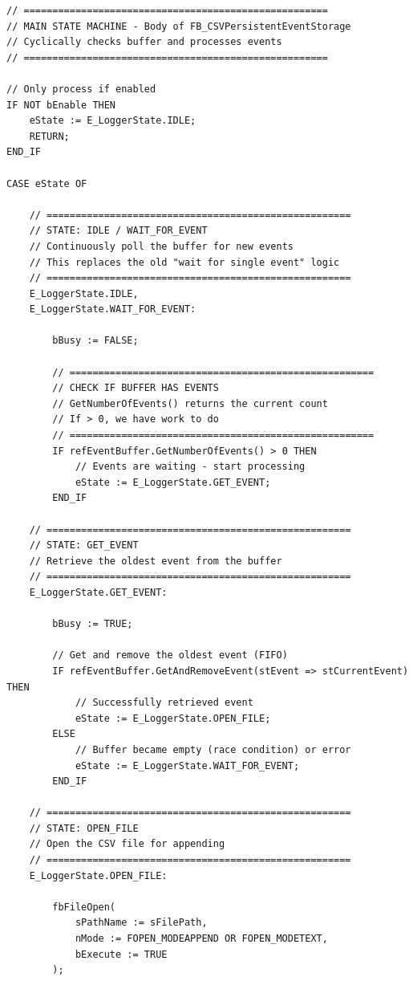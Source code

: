 \documentclass[11pt,a4paper]{article}
\begin{document}
\begin{lstlisting}
// =====================================================
// MAIN STATE MACHINE - Body of FB_CSVPersistentEventStorage
// Cyclically checks buffer and processes events
// =====================================================

// Only process if enabled
IF NOT bEnable THEN
    eState := E_LoggerState.IDLE;
    RETURN;
END_IF

CASE eState OF
    
    // =====================================================
    // STATE: IDLE / WAIT_FOR_EVENT
    // Continuously poll the buffer for new events
    // This replaces the old "wait for single event" logic
    // =====================================================
    E_LoggerState.IDLE,
    E_LoggerState.WAIT_FOR_EVENT:
        
        bBusy := FALSE;
        
        // =====================================================
        // CHECK IF BUFFER HAS EVENTS
        // GetNumberOfEvents() returns the current count
        // If > 0, we have work to do
        // =====================================================
        IF refEventBuffer.GetNumberOfEvents() > 0 THEN
            // Events are waiting - start processing
            eState := E_LoggerState.GET_EVENT;
        END_IF
        
    // =====================================================
    // STATE: GET_EVENT
    // Retrieve the oldest event from the buffer
    // =====================================================
    E_LoggerState.GET_EVENT:
        
        bBusy := TRUE;
        
        // Get and remove the oldest event (FIFO)
        IF refEventBuffer.GetAndRemoveEvent(stEvent => stCurrentEvent) THEN
            // Successfully retrieved event
            eState := E_LoggerState.OPEN_FILE;
        ELSE
            // Buffer became empty (race condition) or error
            eState := E_LoggerState.WAIT_FOR_EVENT;
        END_IF
        
    // =====================================================
    // STATE: OPEN_FILE
    // Open the CSV file for appending
    // =====================================================
    E_LoggerState.OPEN_FILE:
        
        fbFileOpen(
            sPathName := sFilePath,
            nMode := FOPEN_MODEAPPEND OR FOPEN_MODETEXT,
            bExecute := TRUE
        );
        

\end{lstlisting}
\end{document}
